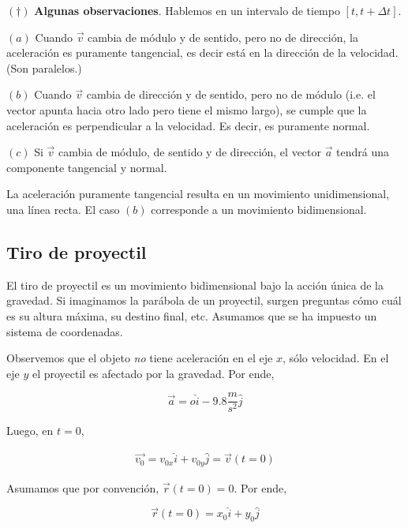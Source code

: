 \documentclass[12pt]{article}
\theoremstyle{definition}
\begin{document}
\begin{shaded}
    $(\dagger)$ \textbf{ Algunas observaciones}. Hablemos en un intervalo de
    tiempo $[t, t + \Delta t]$.

    $(a)$ Cuando $\vec{v}$ cambia de módulo y de sentido, pero no de dirección,
    la aceleración es puramente tangencial, es decir está en la dirección de la
    velocidad. (Son paralelos.) 

    $(b)$ Cuando $\vec{v}$ cambia de dirección y de sentido, pero no de módulo
    (i.e. el vector apunta hacia otro lado pero tiene el mismo largo), se cumple
    que la aceleración es perpendicular a la velocidad. Es decir, es puramente
    normal.

    $(c)$ Si $\vec{v}$ cambia de módulo, de sentido y de dirección, el vector 
    $\vec{a}$ tendrá una componente tangencial y normal.

    La aceleración puramente  tangencial resulta en un movimiento
    unidimensional, una línea recta. El caso $(b)$ corresponde a un movimiento
    bidimensional.
\end{shaded}

\subsection{Tiro de proyectil}

El tiro de proyectil es un movimiento bidimensional bajo la acción única de la
gravedad. Si imaginamos la parábola de un proyectil, surgen preguntas cómo cuál
es su altura máxima, su destino final, etc. Asumamos que se ha impuesto un
sistema de coordenadas.

Observemos que el objeto \textit{no} tiene aceleración en el eje $x$, sólo
velocidad. En el eje $y$ el proyectil es afectado por la gravedad.
Por ende, 

\begin{equation*}
\vec{a} = o \hat{i} - 9.8 \frac{m}{s^2} \hat{j}
\end{equation*}

Luego, en $t = 0$, 

\begin{align*}
    \vec{v_0} = v_{0x} \hat{ i} + v_{0y} \hat{j} = \vec{v}(t = 0)
\end{align*}

Asumamos que por convención, $\vec{r}(t = 0) = 0$. Por ende, 

\begin{equation*}
    \vec{r}(t = 0) = x_0 \hat{i} + y_0 \hat{j} 
\end{equation*}
\end{document}
